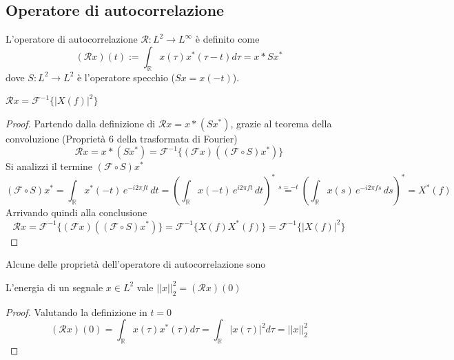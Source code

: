     \subsection{Operatore di autocorrelazione}
        \begin{definition}[Autocorrelazione]
            L'operatore di autocorrelazione $\mathcal{R}: L^2 \rightarrow L^\infty$ è definito come
            \[
                (\mathcal{R} x)(t) := \int_{\mathbb{R}} x(\tau) x^*(\tau - t) d\tau = x * Sx^*
            \]
            dove $S: L^2 \rightarrow L^2$ è l'operatore specchio ($Sx = x(-t)$).
        \end{definition}

        \begin{proposition}
            $\mathcal{R} x = \mathcal{F}^{-1}\{ |X(f)|^2 \}$ 
        \end{proposition}
        \begin{proof}
            Partendo dalla definizione di $\mathcal{R} x = x * (Sx^*)$, grazie al teorema della convoluzione (Proprietà 6 della trasformata di Fourier)
            \[
                \mathcal{R} x = x * (Sx^*) = \mathcal{F}^{-1} \{ (\mathcal{F} x)((\mathcal{F} \circ S) x^*) \}
            \]
            Si analizzi il termine $(\mathcal{F} \circ S) x^*$
            \[
                (\mathcal{F} \circ S)x^*
                = \int_{\mathbb{R}} x^*(-t)\, e^{-i2\pi f t}\, dt
                = \left( \int_{\mathbb{R}} x(-t)\, e^{i2\pi f t}\, dt \right)^*
                \overset{s=-t}{=} \left( \int_{\mathbb{R}} x(s)\, e^{-i2\pi f s}\, ds \right)^*
                = X^*(f)
            \]
            Arrivando quindi alla conclusione
            \[
                \mathcal{R} x = \mathcal{F}^{-1} \{ (\mathcal{F} x)((\mathcal{F} \circ S) x^*) \} = \mathcal{F}^{-1} \{ X(f) X^*(f) \} = \mathcal{F}^{-1} \{ |X(f)|^2 \}
            \]
        \end{proof}


        Alcune delle proprietà dell'operatore di autocorrelazione sono
        
        \begin{property}[Energia]
            L'energia di un segnale $x \in L^2$ vale $||x||^2_2 = (\mathcal{R}x)(0)$
        \end{property}
        \begin{proof}
            Valutando la definizione in $t = 0$
            \[
                (\mathcal{R}x)(0) = \int_{\mathbb{R}} x(\tau) x^*(\tau) d\tau = \int_{\mathbb{R}} |x(\tau)|^2 d\tau = ||x||^2_2
            \]
        \end{proof}


